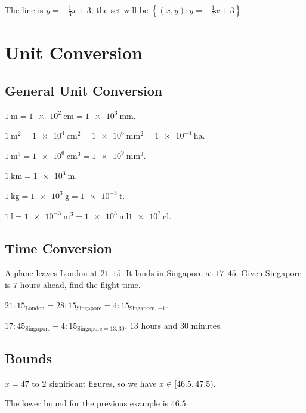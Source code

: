 \documentclass[8pt]{article}
\begin{document}
		The line is \(y = -\frac{1}{3}x + 3\); the set will be \(\left\{(x, y): y = -\frac{1}{3}x + 3\right\}\).

	\section{Unit Conversion}
		\subsection{General Unit Conversion}
			\exmp {} \(\qty{1}{\metre} = \qty{1e2}{\cm} = \qty{1e3}{\mm}\).
			
			\exmp {} \(\qty{1}{\metre\squared} = \qty{1e4}{\cm\squared} = \qty{1e6}{\mm\squared} = \qty{1e-4}{\hectare}\).
			
			\exmp {} \(\qty{1}{\metre\cubed} = \qty{1e6}{\cm\cubed} = \qty{1e9}{\mm\cubed}\).

			\exmp {} \(\qty{1}{\km} = \qty{1e3}{\metre}\).

			\exmp {} \(\qty{1}{\kg} = \qty{1e3}{\gram} = \qty{1e-3}{\tonne}\).

			\exmp {} \(\qty{1}{\litre} = \qty{1e-3}{\metre\cubed} = \qty{1e3}{\milli\litre} \qty{1e2}{\centi\litre}\).

		\subsection{Time Conversion}
			\prob A plane leaves London at \(21:15\). It lands in Singapore at \(17:45\). Given Singapore is \(7\) hours ahead, find the flight time.

			\solution \(21:15_{\text{London}} = 28:15_{\text{Singapore}} = 4:15_{\text{Singapore, +1}}\).
			
			\(17:45_{\text{Singapore}} - 4:15_{\text{Singapore} = 13:30}\). \(13\) hours and \(30\) minutes.

		\subsection{Bounds}
			\exmp {} \(x = 47\) to \(2\) significant figures, so we have \(x \in [46.5, 47.5)\).

			\defi {} The lower bound for the previous example is \(46.5\).
\end{document}

